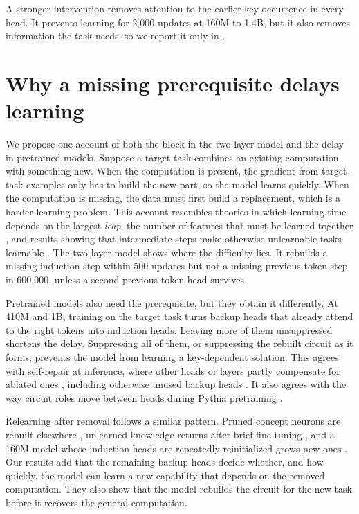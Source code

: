 A stronger intervention removes attention to the earlier key occurrence in every
head. It prevents learning for 2,000 updates at 160M to 1.4B, but it also removes
information the task needs, so we report it only in .

\section{Why a missing prerequisite delays learning}
\label{sec:discussion}

We propose one account of both the block in the two-layer model and the delay in
pretrained models. Suppose a target task combines an existing computation with
something new. When the computation is present, the gradient from target-task
examples only has to build the new part, so the model learns quickly. When the
computation is missing, the data must first build a replacement, which is a harder
learning problem. This account resembles theories in which learning time depends on
the largest \emph{leap}, the number of features that must be learned together
\citep{abbe2021staircase,abbe2023leap}, and results showing that intermediate steps
make otherwise unlearnable tasks learnable \citep{wies2023subtask}. The two-layer
model shows where the difficulty lies. It rebuilds a missing induction step within
500 updates but not a missing previous-token step in 600,000, unless a second
previous-token head survives.

Pretrained models also need the prerequisite, but they obtain it differently. At
410M and 1B, training on the target task turns backup heads that already attend to
the right tokens into induction heads. Leaving more of them unsuppressed shortens
the delay. Suppressing all of them, or suppressing the rebuilt circuit as it forms,
prevents the model from learning a key-dependent solution. This agrees with
self-repair at inference, where other heads or layers partly compensate for ablated
ones \citep{mcgrath2023hydra,rushing2024selfrepair,mcdougall2024copy}, including
otherwise unused backup heads \citep{wang2023ioi,gong2026coax}. It also agrees with
the way circuit roles move between heads during Pythia pretraining
\citep{tigges2024consistent}.

Relearning after removal follows a similar pattern. Pruned concept neurons are
rebuilt elsewhere \citep{lo2024relearn}, unlearned knowledge returns after brief
fine-tuning
\citep{deeb2024unlearning,hu2025jogging,lucki2025adversarial,jain2024mechanistically},
and a 160M model whose induction heads are repeatedly reinitialized grows new ones
\citep{sahin2025hapax}. Our results add that the remaining backup heads decide
whether, and how quickly, the model can learn a new capability that depends on the
removed computation. They also show that the model rebuilds the circuit for the new
task before it recovers the general computation.

